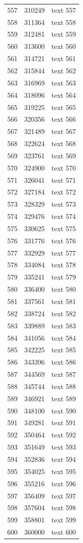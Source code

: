 \documentclass[10pt]{article}
\begin{document}
\begin{longtable}{rrl}
557&310249&text 557\\
558&311364&text 558\\
559&312481&text 559\\
560&313600&text 560\\
561&314721&text 561\\
562&315844&text 562\\
563&316969&text 563\\
564&318096&text 564\\
565&319225&text 565\\
566&320356&text 566\\
567&321489&text 567\\
568&322624&text 568\\
569&323761&text 569\\
570&324900&text 570\\
571&326041&text 571\\
572&327184&text 572\\
573&328329&text 573\\
574&329476&text 574\\
575&330625&text 575\\
576&331776&text 576\\
577&332929&text 577\\
578&334084&text 578\\
579&335241&text 579\\
580&336400&text 580\\
581&337561&text 581\\
582&338724&text 582\\
583&339889&text 583\\
584&341056&text 584\\
585&342225&text 585\\
586&343396&text 586\\
587&344569&text 587\\
588&345744&text 588\\
589&346921&text 589\\
590&348100&text 590\\
591&349281&text 591\\
592&350464&text 592\\
593&351649&text 593\\
594&352836&text 594\\
595&354025&text 595\\
596&355216&text 596\\
597&356409&text 597\\
598&357604&text 598\\
599&358801&text 599\\
600&360000&text 600\\
\end{longtable}
\end{document}

